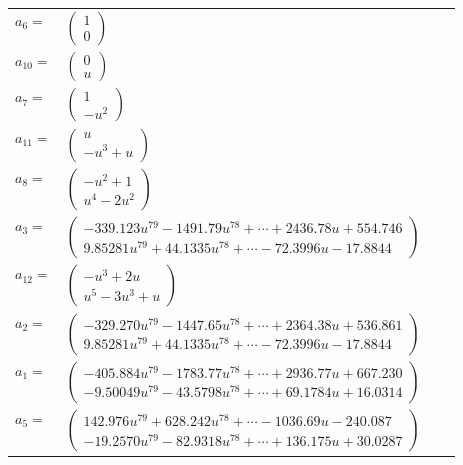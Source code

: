 \documentclass[1p]{elsarticle_modified}
\theoremstyle{definition}
\begin{document}
\begin{tabular}{m{7pt} m{180pt} m{7pt} m{180pt} }
\flushright $a_{6}=$&$\begin{pmatrix}1\\0\end{pmatrix}$ \\
\flushright $a_{10}=$&$\begin{pmatrix}0\\u\end{pmatrix}$ \\
\flushright $a_{7}=$&$\begin{pmatrix}1\\- u^2\end{pmatrix}$ \\
\flushright $a_{11}=$&$\begin{pmatrix}u\\- u^3+u\end{pmatrix}$ \\
\flushright $a_{8}=$&$\begin{pmatrix}- u^2+1\\u^4-2 u^2\end{pmatrix}$ \\
\flushright $a_{3}=$&$\begin{pmatrix}-339.123 u^{79}-1491.79 u^{78}+\cdots+2436.78 u+554.746\\9.85281 u^{79}+44.1335 u^{78}+\cdots-72.3996 u-17.8844\end{pmatrix}$ \\
\flushright $a_{12}=$&$\begin{pmatrix}- u^3+2 u\\u^5-3 u^3+u\end{pmatrix}$ \\
\flushright $a_{2}=$&$\begin{pmatrix}-329.270 u^{79}-1447.65 u^{78}+\cdots+2364.38 u+536.861\\9.85281 u^{79}+44.1335 u^{78}+\cdots-72.3996 u-17.8844\end{pmatrix}$ \\
\flushright $a_{1}=$&$\begin{pmatrix}-405.884 u^{79}-1783.77 u^{78}+\cdots+2936.77 u+667.230\\-9.50049 u^{79}-43.5798 u^{78}+\cdots+69.1784 u+16.0314\end{pmatrix}$ \\
\flushright $a_{5}=$&$\begin{pmatrix}142.976 u^{79}+628.242 u^{78}+\cdots-1036.69 u-240.087\\-19.2570 u^{79}-82.9318 u^{78}+\cdots+136.175 u+30.0287\end{pmatrix}$ \\

\end{tabular}
\end{document}
